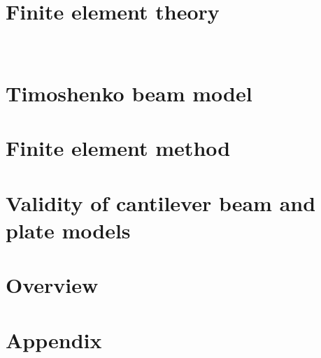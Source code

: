 \documentclass[12pt]{report}
\begin{document}
\chapter{Finite element theory}


\

\chapter{Timoshenko beam model}
 






\chapter{Finite element method}




\chapter{Validity of cantilever beam and plate models}




\chapter{Overview}


% 

\printbibliography


\chapter*{Appendix}



% 
% 
% 
% 
\end{document}
